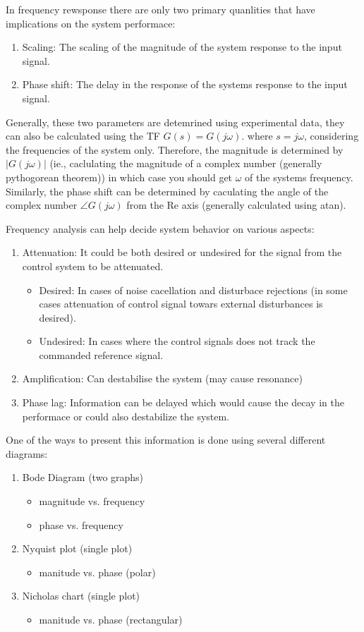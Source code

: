 In frequency rewsponse there are only two primary quanlities that have implications on the system performace:
\begin{enumerate}
	\item Scaling: The scaling of the magnitude of the system response to the input signal.
	\item Phase shift: The delay in the response of the systems response to the input signal.
\end{enumerate}

Generally, these two parameters are detemrined using experimental data, they can also be calculated using the TF $G(s) = G(j\omega)$. where $s = j \omega$, considering the frequencies of the system only. Therefore, the magnitude is determined by $|G(j \omega)|$ (ie., caclulating the magnitude of a complex number (generally pythogorean theorem)) in which case you should get $\omega$ of the systems frequency. Similarly, the phase shift can be determined by caculating the angle of the complex number $\angle G(j\omega)$ from the Re axis (generally calculated using atan).

Frequency analysis can help decide system behavior on various aspects: \label{List_FreqResp_Behavior}
\begin{enumerate}
	\item Attenuation: It could be both desired or undesired for the signal from the control system to be attenuated.
	\begin{itemize}
		\item Desired: In cases of noise cacellation and disturbace rejections (in some cases attenuation of control signal towars external disturbances is desired).
		\item Undesired: In cases where the control signals does not track the commanded reference signal.
	\end{itemize}
	\item Amplification: Can destabilise the system (may cause resonance)
	\item Phase lag: Information can be delayed which would cause the decay in the performace or could also destabilize the system.
\end{enumerate}

One of the ways to present this information is done using several different diagrams:
\begin{enumerate}
	\item Bode Diagram (two graphs)
	\begin{itemize}
		\item magnitude vs. frequency
		\item phase vs. frequency
	\end{itemize}
	\item  Nyquist plot (single plot)
	\begin{itemize}
		\item  manitude vs. phase (polar)
	\end{itemize}
	\item  Nicholas chart (single plot)
	\begin{itemize}
		\item  manitude vs. phase (rectangular)
	\end{itemize}
\end{enumerate}


